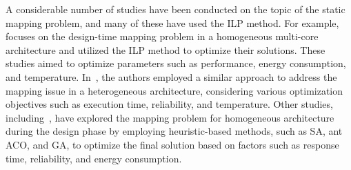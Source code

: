 A considerable number of studies have been conducted on the topic of the static mapping problem, and many of these have used the ILP method. For example, \cite{kaida2012task,niemann1997algorithm,ding2013shared,coskun2008temperature} focuses on the design-time mapping problem in a homogeneous multi-core architecture and utilized the ILP method to optimize their solutions. These studies aimed to optimize parameters such as performance, energy consumption, and temperature.
In~\cite{girault2019erpot}, the authors employed a similar approach to address the mapping issue in a heterogeneous architecture, considering various optimization objectives such as execution time, reliability, and temperature. Other studies, including~\cite{giannopoulou2014mapping,hartman2010case,huang2009lifetime,das2014combined}, have explored the mapping problem for homogeneous architecture during the design phase by employing heuristic-based methods, such as SA, ant ACO, and GA, to optimize the final solution based on factors such as response time, reliability, and energy consumption.


